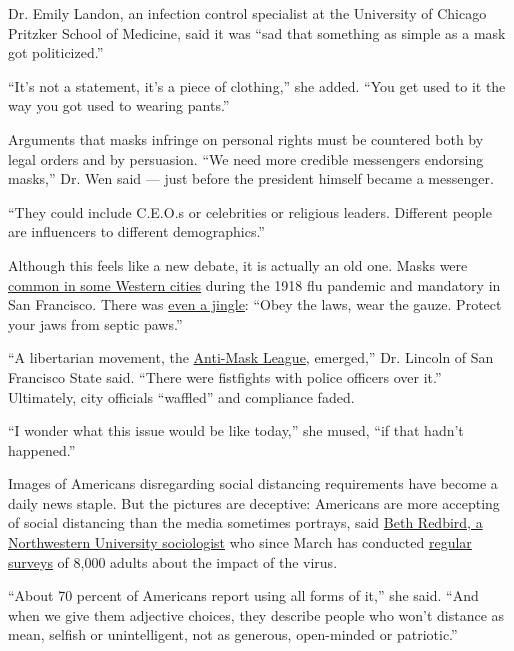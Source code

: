 Dr. Emily Landon, an infection control specialist at the University of
Chicago Pritzker School of Medicine, said it was ``sad that something as
simple as a mask got politicized.''

``It's not a statement, it's a piece of clothing,'' she added. ``You get
used to it the way you got used to wearing pants.''

Arguments that masks infringe on personal rights must be countered both
by legal orders and by persuasion. ``We need more credible messengers
endorsing masks,'' Dr. Wen said --- just before the president himself
became a messenger.

``They could include C.E.O.s or celebrities or religious leaders.
Different people are influencers to different demographics.''

Although this feels like a new debate, it is actually an old one. Masks
were
\href{https://www.history.com/news/1918-spanish-flu-mask-wearing-resistance}{common
in some Western cities} during the 1918 flu pandemic and mandatory in
San Francisco. There was
\href{https://www.pbs.org/wgbh/americanexperience/features/influenza-san-francisco/\#:~:text=One\%20of\%20the\%20more\%20highly,the\%20spread\%20of\%20flu\%20germs.\&text=A\%20Mask\%20is\%2099\%25\%20Proof,laws\%2C\%20and\%20wear\%20the\%20gauze.}{even
a jingle}: ``Obey the laws, wear the gauze. Protect your jaws from
septic paws.''

``A libertarian movement, the
\href{https://en.wikipedia.org/wiki/Anti-Mask_League_of_San_Francisco}{Anti-Mask
League}, emerged,'' Dr. Lincoln of San Francisco State said. ``There
were fistfights with police officers over it.'' Ultimately, city
officials ``waffled'' and compliance faded.

``I wonder what this issue would be like today,'' she mused, ``if that
hadn't happened.''

Images of Americans disregarding social distancing requirements have
become a daily news staple. But the pictures are deceptive: Americans
are more accepting of social distancing than the media sometimes
portrays, said
\href{https://magazine.northwestern.edu/exclusives/covid-19-impact-research/}{Beth
Redbird, a Northwestern University sociologist} who since March has
conducted \href{https://coronadata.us/data/}{regular surveys} of 8,000
adults about the impact of the virus.

``About 70 percent of Americans report using all forms of it,'' she
said. ``And when we give them adjective choices, they describe people
who won't distance as mean, selfish or unintelligent, not as generous,
open-minded or patriotic.''

